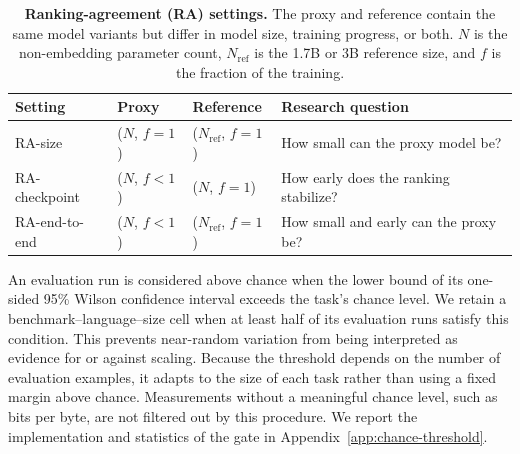 \begin{table}[h!]
    \centering
    \begin{tabular}{llll}
        \toprule
        Setting & Proxy & Reference & Research question \\
        \midrule
        RA-size
            & ($N$, $f=1$)
            & ($N_{\mathrm{ref}}$, $f=1$)
            & How small can the proxy model be? \\
        RA-checkpoint
            & ($N$, $f<1$)
            & ($N$, \quad $f=1$)
            & How early does the ranking stabilize? \\
        RA-end-to-end
            & ($N$, $f<1$)
            & ($N_{\mathrm{ref}}$, $f=1$)
            & How small and early can the proxy be? \\
        \bottomrule
    \end{tabular}
        \caption{\textbf{Ranking-agreement (RA) settings.} The proxy and reference contain the same model variants but differ in model size, training progress, or both. $N$ is the non-embedding parameter count, $N_{\mathrm{ref}}$ is the 1.7B or 3B reference size, and $f$ is the fraction of the training.}
    \label{tab:ra_defs}
\end{table}


An evaluation run is considered above chance when the lower bound of its one-sided 95\% Wilson confidence interval exceeds the task's chance level.
We retain a benchmark--language--size cell when at least half of its evaluation runs satisfy this condition.
This prevents near-random variation from being interpreted as evidence for or against scaling.
Because the threshold depends on the number of evaluation examples, it adapts to the size of each task rather than using a fixed margin above chance.
Measurements without a meaningful chance level, such as bits per byte, are not filtered out by this procedure.
We report the implementation and statistics of the gate in Appendix~\ref{app:chance-threshold}.

